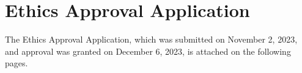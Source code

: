 \newpage
\section{\label{sec:ethics-approval-application}Ethics Approval Application}
The Ethics Approval Application, which was submitted on November 2, 2023, and approval was granted on December 6, 2023, is attached on the following pages.
